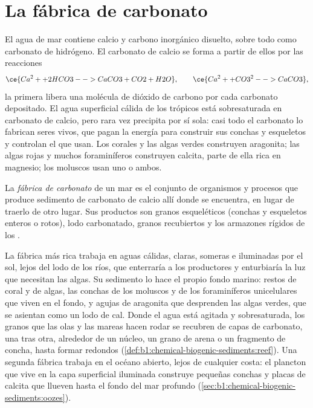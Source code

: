 \section{La fábrica de carbonato}\label{sec:b1:chemical-biogenic-sediments:factory}

El agua de mar contiene calcio y carbono inorgánico disuelto, sobre todo como carbonato de hidrógeno. El carbonato de calcio se forma a partir de ellos por las reacciones
\[
\ce{Ca^2+ + 2 HCO3- -> CaCO3 + CO2 + H2O}, \qquad
\ce{Ca^2+ + CO3^2- -> CaCO3},
\]
la primera libera una molécula de dióxido de carbono por cada carbonato depositado. El agua superficial cálida de los trópicos está sobresaturada en carbonato de calcio, pero rara vez
precipita por sí sola: casi todo el carbonato lo fabrican seres vivos, que pagan la energía para construir sus conchas y esqueletos y controlan el  que usan. Los corales y las algas verdes
construyen aragonita; las algas rojas y muchos foraminíferos construyen calcita, parte de ella rica en magnesio; los moluscos usan uno o ambos.

\begin{definition}\label{def:b1:chemical-biogenic-sediments:factory}
La \emph{fábrica de carbonato} de un mar es el conjunto de organismos y procesos que produce sedimento de carbonato de calcio allí donde se encuentra, en lugar
de traerlo de otro lugar. Sus productos son granos esqueléticos (conchas y esqueletos enteros o rotos), lodo carbonatado, granos recubiertos y los armazones rígidos de los .
\end{definition}

La fábrica más rica trabaja en aguas cálidas, claras, someras e iluminadas por el sol, lejos del lodo de los ríos, que enterraría a los productores y enturbiaría la luz que necesitan las algas.
Su sedimento lo hace el propio fondo marino: restos de coral y de algas, las conchas de los moluscos y de los foraminíferos unicelulares que viven en el fondo, y agujas de aragonita que
desprenden las algas verdes, que se asientan como un lodo de cal. Donde el agua está agitada y sobresaturada, los granos que las olas y las mareas hacen rodar se recubren de capas de carbonato,
una tras otra, alrededor de un núcleo, un grano de arena o un fragmento de concha, hasta formar  redondos
(\cref{def:b1:chemical-biogenic-sediments:reef}). Una segunda fábrica trabaja en el océano abierto, lejos de cualquier costa: el plancton que vive en la capa superficial iluminada construye
pequeñas conchas y placas de calcita que llueven hasta el fondo del mar profundo (\cref{sec:b1:chemical-biogenic-sediments:oozes}).


